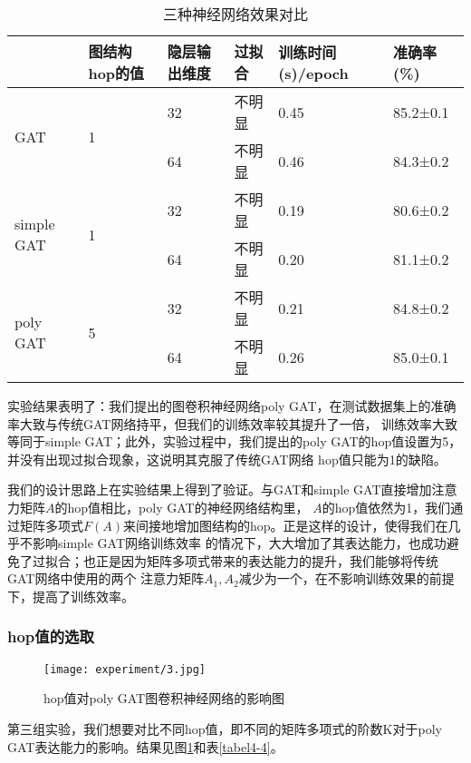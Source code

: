 \begin{table}[htbp]
    \centering
    \caption{三种神经网络效果对比}
    \label{tabel4-3}
    \begin{tabular}{|l|l|l|l|l|l|}
    \hline
                                & 图结构hop的值           & 隐层输出维度 & 过拟合 & 训练时间(s)/epoch & 准确率(\%)       \\ \hline
    \multirow{2}{*}{GAT}        & \multirow{2}{*}{1} & 32     & 不明显 & 0.45           & 85.2±0.1 \\ \cline{3-6} 
                                &                    & 64     & 不明显 & 0.46           & 84.3±0.2 \\ \hline
    \multirow{2}{*}{simple GAT} & \multirow{2}{*}{1} & 32     & 不明显 & 0.19           & 80.6±0.2 \\ \cline{3-6} 
                                &                    & 64     & 不明显 & 0.20           & 81.1±0.2 \\ \hline
    \multirow{2}{*}{poly GAT}    & \multirow{2}{*}{5} & 32     & 不明显 & 0.21           & 84.8±0.2 \\ \cline{3-6} 
                                &                    & 64     & 不明显 & 0.26           & 85.0±0.1 \\ \hline
    \end{tabular}
\end{table}

实验结果表明了：我们提出的图卷积神经网络poly GAT，在测试数据集上的准确率大致与传统GAT网络持平，但我们的训练效率较其提升了一倍，
训练效率大致等同于simple GAT；此外，实验过程中，我们提出的poly GAT的hop值设置为5，并没有出现过拟合现象，这说明其克服了传统GAT网络
hop值只能为1的缺陷。

我们的设计思路上在实验结果上得到了验证。与GAT和simple GAT直接增加注意力矩阵$A$的hop值相比，poly GAT的神经网络结构里，
$A$的hop值依然为1，我们通过矩阵多项式$ F(A) $来间接地增加图结构的hop。正是这样的设计，使得我们在几乎不影响simple GAT网络训练效率
的情况下，大大增加了其表达能力，也成功避免了过拟合；也正是因为矩阵多项式带来的表达能力的提升，我们能够将传统GAT网络中使用的两个
注意力矩阵$ A_1,A_2 $减少为一个，在不影响训练效果的前提下，提高了训练效率。

\subsubsection{hop值的选取}
\begin{figure}[htbp]
    \centering
    \texttt{[image: experiment/3.jpg]}
    \caption{\label{4-3}hop值对poly GAT图卷积神经网络的影响图}
\end{figure}
第三组实验，我们想要对比不同hop值，即不同的矩阵多项式的阶数K对于poly GAT表达能力的影响。结果见图\ref{4-3}和表\ref{tabel4-4}。

